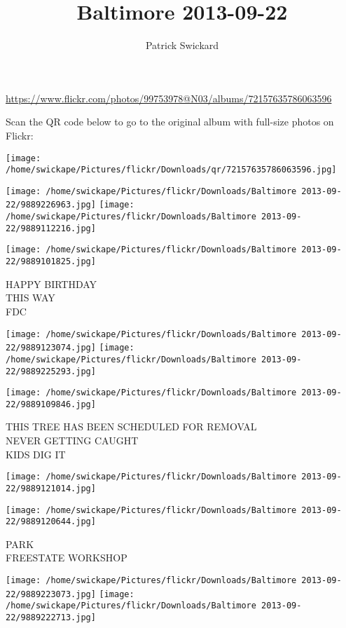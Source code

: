 \documentclass[10pt,letterpaper]{article}
\title{Baltimore 2013-09-22}
\author{Patrick Swickard}
\date{}
\begin{document}
\maketitle

\url{https://www.flickr.com/photos/99753978@N03/albums/72157635786063596}

Scan the QR code below to go to the original album with full-size photos on Flickr:

\texttt{[image: /home/swickape/Pictures/flickr/Downloads/qr/72157635786063596.jpg]}
\pagebreak

\texttt{[image: /home/swickape/Pictures/flickr/Downloads/Baltimore 2013-09-22/9889226963.jpg]}
\texttt{[image: /home/swickape/Pictures/flickr/Downloads/Baltimore 2013-09-22/9889112216.jpg]}

\vspace{0.25in}
\texttt{[image: /home/swickape/Pictures/flickr/Downloads/Baltimore 2013-09-22/9889101825.jpg]}

HAPPY BIRTHDAY\\
THIS WAY\\
FDC
\pagebreak

\texttt{[image: /home/swickape/Pictures/flickr/Downloads/Baltimore 2013-09-22/9889123074.jpg]}
\texttt{[image: /home/swickape/Pictures/flickr/Downloads/Baltimore 2013-09-22/9889225293.jpg]}

\texttt{[image: /home/swickape/Pictures/flickr/Downloads/Baltimore 2013-09-22/9889109846.jpg]}

THIS TREE HAS BEEN SCHEDULED FOR REMOVAL\\
NEVER GETTING CAUGHT\\
KIDS DIG IT
\pagebreak

\texttt{[image: /home/swickape/Pictures/flickr/Downloads/Baltimore 2013-09-22/9889121014.jpg]}

\vspace{0.25in}
\texttt{[image: /home/swickape/Pictures/flickr/Downloads/Baltimore 2013-09-22/9889120644.jpg]}

PARK\\
FREESTATE WORKSHOP
\pagebreak

\texttt{[image: /home/swickape/Pictures/flickr/Downloads/Baltimore 2013-09-22/9889223073.jpg]}
\texttt{[image: /home/swickape/Pictures/flickr/Downloads/Baltimore 2013-09-22/9889222713.jpg]}
\end{document}
